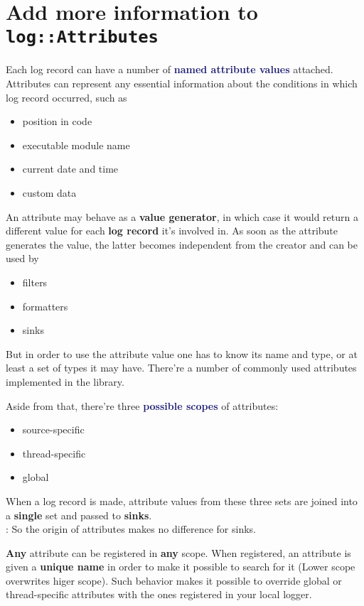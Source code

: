 \documentclass[dvipsnames]{article}
\newcommand{\mycola}{MidnightBlue}
\newcommand{\Cola}[1]{\textcolor{\mycola}{\textbf{#1}}}
\begin{document}
\section{Add more information to \texttt{log::Attributes}}

Each log record can have a number of \Cola{named attribute values} attached.
Attributes can represent any essential information about the conditions in which
log record occurred, such as
\begin{itemize}
\item position in code
\item executable module name
\item current date and time
\item custom data
\end{itemize}

An attribute may behave as a \textbf{value generator}, in which case it would return a
different value for each \textbf{log record} it's involved in. As soon as the
attribute generates the value, the latter becomes independent from the creator
and can be used by
\begin{itemize}
\item filters
\item formatters
\item sinks
\end{itemize}

But in order to use the attribute value one has to know its name and type, or at
least a set of types it may have. There're a number of commonly used attributes
implemented in the library.

Aside from that, there're three \Cola{possible scopes} of attributes:
\begin{itemize}
\item source-specific
\item thread-specific
\item global
\end{itemize}
When a log record is made, attribute values from these three sets are joined
into a \textbf{single} set and passed to \textbf{sinks}.\\
 : So the origin of attributes makes no difference for sinks.

\textbf{Any} attribute can be registered in \textbf{any} scope. When registered,
an attribute is given a \textbf{unique name} in order to make it possible to
search for it (Lower scope overwrites higer scope). Such behavior makes it
possible to override global or thread-specific attributes with the ones
registered in your local logger.
\end{document}
